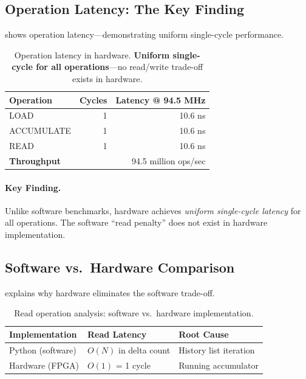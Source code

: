 \documentclass[11pt,letterpaper]{article}
\theoremstyle{plain}
\theoremstyle{definition}
\theoremstyle{remark}
\begin{document}
\subsection{Operation Latency: The Key Finding}

 shows operation latency---demonstrating uniform single-cycle performance.

\begin{table}[!htbp]
\centering
\caption{Operation latency in hardware. \textbf{Uniform single-cycle for all operations}---no read/write trade-off exists in hardware.}
\label{tab:latency}
\begin{tabular}{@{}lrr@{}}
\toprule
\textbf{Operation} & \textbf{Cycles} & \textbf{Latency @ 94.5 MHz} \\
\midrule
LOAD & 1 & 10.6 ns \\
ACCUMULATE & 1 & 10.6 ns \\
READ & 1 & 10.6 ns \\
\midrule
\textbf{Throughput} & \multicolumn{2}{r}{94.5 million ops/sec} \\
\bottomrule
\end{tabular}
\end{table}

\paragraph{Key Finding.} Unlike software benchmarks, hardware achieves \emph{uniform single-cycle latency} for all operations. The software ``read penalty'' does not exist in hardware implementation.

\subsection{Software vs.\ Hardware Comparison}

 explains why hardware eliminates the software trade-off.

\begin{table}[!htbp]
\centering
\caption{Read operation analysis: software vs.\ hardware implementation.}
\label{tab:comparison}
\begin{tabular}{@{}lll@{}}
\toprule
\textbf{Implementation} & \textbf{Read Latency} & \textbf{Root Cause} \\
\midrule
Python (software) & $O(N)$ in delta count & History list iteration \\
Hardware (FPGA) & $O(1)$ = 1 cycle & Running accumulator \\
\bottomrule
\end{tabular}
\end{table}
\end{document}
